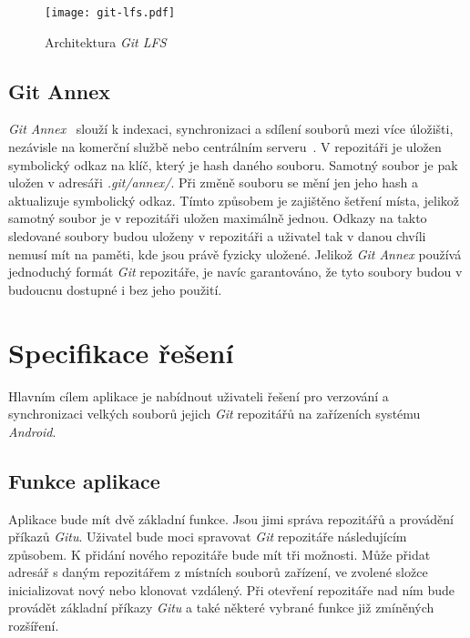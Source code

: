 \begin{figure}[h!]
    \begin{minipage}{\textwidth}
    \centering
    \vspace{0.5cm}
    \texttt{[image: git-lfs.pdf]}
    \caption{Architektura \emph{Git LFS}~\cite{git-lfs}}
    \label{diagram:git-lfs}
    \end{minipage}
\end{figure}

\section{Git Annex}
\emph{Git Annex}~\cite{git-annex} slouží k indexaci, synchronizaci a sdílení souborů mezi více úložišti, nezávisle na komerční službě nebo centrálním serveru~\cite{wiki-git-annex}. V repozitáři je uložen symbolický odkaz na klíč, který je hash daného souboru. Samotný soubor je pak uložen v adresáři \emph{.git/annex/}. Při změně souboru se mění jen jeho hash a aktualizuje symbolický odkaz. Tímto způsobem je zajištěno šetření místa, jelikož samotný soubor je v repozitáři uložen maximálně jednou. Odkazy na takto sledované soubory budou uloženy v repozitáři a uživatel tak v danou chvíli nemusí mít na paměti, kde jsou právě fyzicky uložené. Jelikož \emph{Git Annex} používá jednoduchý formát \emph{Git} repozitáře, je navíc garantováno, že tyto soubory budou v budoucnu dostupné i bez jeho použití.

\chapter{Specifikace řešení}
Hlavním cílem aplikace je nabídnout uživateli řešení pro verzování a synchronizaci velkých souborů jejich \emph{Git} repozitářů na zařízeních systému \emph{Android}.

\section{Funkce aplikace}
Aplikace bude mít dvě základní funkce. Jsou jimi správa repozitářů a provádění příkazů \emph{Gitu}. Uživatel bude moci spravovat \emph{Git} repozitáře následujícím způsobem. K přidání nového repozitáře bude mít tři možnosti. Může přidat adresář s daným repozitářem z místních souborů zařízení, ve zvolené složce inicializovat nový nebo klonovat vzdálený. Při otevření repozitáře nad ním bude provádět základní příkazy \emph{Gitu} a také některé vybrané funkce již zmíněných rozšíření.

